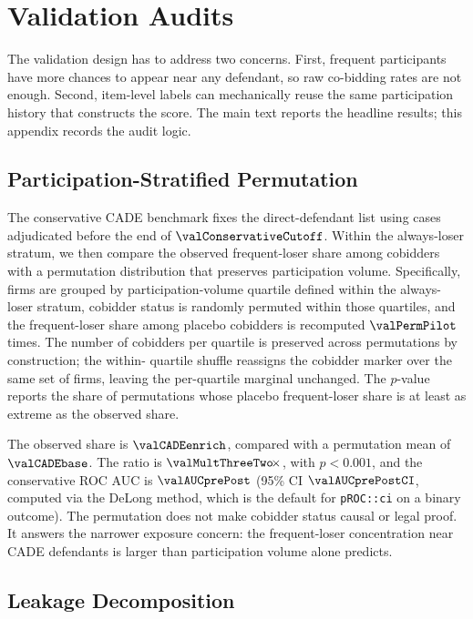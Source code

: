 \section{Validation Audits}
\label{app:validation_audits_v18}

The validation design has to address two concerns. First,
frequent participants have more chances to appear near any
defendant, so raw co-bidding rates are not enough. Second,
item-level labels can mechanically reuse the same participation
history that constructs the score. The main text reports the
headline results; this appendix records the audit logic.

\subsection{Participation-Stratified Permutation}
\label{app:permutation_v18}

The conservative CADE benchmark fixes the direct-defendant list
using cases adjudicated before the end of
$\valConservativeCutoff$. Within the always-loser stratum, we
then compare the observed frequent-loser share among cobidders
with a permutation distribution that preserves participation
volume. Specifically, firms are grouped by participation-volume
quartile defined within the always-loser stratum, cobidder
status is randomly permuted within those quartiles, and the
frequent-loser share among placebo cobidders is recomputed
$\valPermPilot$ times. The number of cobidders per quartile is
preserved across permutations by construction; the within-
quartile shuffle reassigns the cobidder marker over the same
set of firms, leaving the per-quartile marginal unchanged. The
$p$-value reports the share of permutations whose placebo
frequent-loser share is at least as extreme as the observed
share.

The observed share is $\valCADEenrich$, compared with a
permutation mean of $\valCADEbase$. The ratio is
$\valMultThreeTwo\!\times$, with $p<0.001$, and the conservative
ROC AUC is $\valAUCprePost$ (95\% CI $\valAUCprePostCI$,
computed via the DeLong method, which is the default for
\texttt{pROC::ci} on a binary outcome). The permutation does
not make cobidder status causal or legal proof. It answers the
narrower exposure concern: the frequent-loser concentration
near CADE defendants is larger than participation volume alone
predicts.

\subsection{Leakage Decomposition}
\label{app:leakage_v18}

